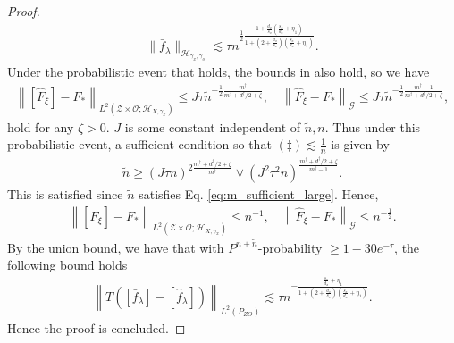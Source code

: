 \documentclass[11pt]{article}
\newcommand{\stageonesamples}{\tilde{n}}
\newcommand{\meffective}{m^{\dag}}
\newcommand{\deffective}{d^{\dag}}
\newcommand{\calZ}{\mathcal{Z}}
\newcommand{\calH}{\mathcal{H}}
\newcommand{\calG}{\mathcal{G}}
\newcommand{\calO}{\mathcal{O}}
\newcommand{\0}{\mathbf{0}}
\begin{document}
\begin{appendix}
\begin{proof}
\begin{align*}
    \|\bar{f}_{\lambda}\|_{\calH_{\gamma_x,\gamma_o}}\lesssim \tau n^{\frac{1}{2}\frac{1 + \frac{d_o}{s_o}(\frac{s_x}{d_x}+\eta_1)}{1 + (2 + \frac{d_o}{s_o})(\frac{s_x}{d_x} + \eta_1)}}.
\end{align*}
Under the probabilistic event that  holds, the bounds in  also hold, so we have
\begin{align*}
    \left\|\left[\hat{F}_\xi \right]-F_*\right\|_{L^2(\calZ\times\calO; \calH_{X,\gamma_x})} \leq J \tau \stageonesamples^{-\frac{1}{2}\frac{\meffective}{\meffective + \deffective/2 + \zeta}} , \quad \left\| \hat{F}_\xi -F_*\right\|_{\calG} \leq J \tau \stageonesamples^{-\frac{1}{2}\frac{\meffective - 1}{\meffective + \deffective/2 + \zeta}} ,
\end{align*}
hold for any $\zeta > 0$. $J$ is some constant independent of $\stageonesamples, n$. 
Thus under this probabilistic event, a sufficient condition so that $(\ddag)\lesssim \frac{1}{n}$ is given by
\begin{align*}
    \stageonesamples \geq (J\tau n)^{2\frac{\meffective+\deffective/2+\zeta}{\meffective}} \vee (J^2\tau^2n)^{\frac{\meffective + \deffective/2 + \zeta}{\meffective - 1}}.
\end{align*}
This is satisfied since $\tilde{n}$ satisfies Eq. \eqref{eq:m_sufficient_large}.
Hence,
\begin{align}\label{eq:m_sufficient_large_CME}
    \left\|\left[\hat{F}_\xi \right]-F_*\right\|_{L^2(\calZ\times\calO; \calH_{X,\gamma_x})} \leq n^{-1} , \quad \left\| \hat{F}_\xi - F_*\right\|_{\calG} \leq n^{-\frac{1}{2}} .
\end{align}
By the union bound, we have that with $P^{n+\stageonesamples}$-probability $\geq 1 - 30 e^{-\tau}$, the following bound holds
\begin{align*}
    \left\|T\left(\left[\bar{f}_{\lambda}\right] - \left[\hat{f}_{\lambda}\right]\right)\right\|_{L^2(P_{ZO})} \lesssim \tau n^{-\frac{\frac{s_x}{d_x}+\eta_1}{1+(2+\frac{d_o}{s_o})(\frac{s_x}{d_x}+\eta_1)}}.
\end{align*}
Hence the proof is concluded. 
\end{proof}


\end{appendix}
\end{document}
